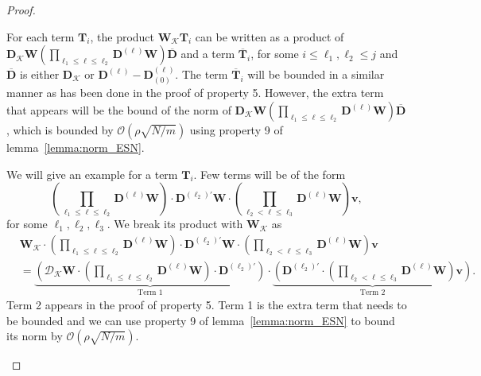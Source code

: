 \begin{proof}
\begin{enumerate}
		For each term $\mathbf{T}_i$, the product $\mathbf{W}_{\mathcal{K}} \mathbf{T}_i$ can be written as a product of $\mathbf{D}_{\mathcal{K}} \mathbf{W} (\prod_{\ell_1 \le \ell \le \ell_2 } \mathbf{D}^{(\ell)} \mathbf{W}) \overline{\mathbf{D}}$ and a term $\overline{\mathbf{T}}_i$, for some $i \le \ell_1, \ell_2 \le j$ and $\overline{\mathbf{D}}$ is either $\mathbf{D}_{\mathcal{K}}$ or $\mathbf{D}^{(\ell)} - \mathbf{D}^{(\ell)}_{(0)}$. The term $\overline{\mathbf{T}}_i$ will be bounded in a similar manner as has been done in the proof of property 5. However, the extra term that appears will be the bound of the norm of $\mathbf{D}_{\mathcal{K}} \mathbf{W} (\prod_{\ell_1 \le \ell \le \ell_2 } \mathbf{D}^{(\ell)} \mathbf{W}) \overline{\mathbf{D}}$, which is bounded by $\mathcal{O}(\rho \sqrt{N/m})$ using property 9 of lemma~\ref{lemma:norm_ESN}. 
		
		We will give an example for a term $\mathbf{T}_i$. Few terms will be of the form \begin{equation*}
			(\prod_{\ell_1 \le \ell \le \ell_2 } \mathbf{D}^{(\ell)} \mathbf{W}) \cdot \mathbf{D}^{(\ell_2)\prime} \mathbf{W}  \cdot (\prod_{\ell_2 < \ell \le \ell_3 } \mathbf{D}^{(\ell)} \mathbf{W}) \mathbf{v}, 
		\end{equation*}
		for some $\ell_1, \ell_2, \ell_3$. We break its product with $\mathbf{W}_{\mathcal{K}}$ as
		\begin{align*}
			&\mathbf{W}_{\mathcal{K}} \cdot (\prod_{\ell_1 \le \ell \le \ell_2 } \mathbf{D}^{(\ell)} \mathbf{W}) \cdot \mathbf{D}^{(\ell_2)\prime} \mathbf{W}  \cdot (\prod_{\ell_2 < \ell \le \ell_3 } \mathbf{D}^{(\ell)} \mathbf{W}) \mathbf{v} \\&=
			\underbrace{\left(\mathcal{D}_{\mathcal{K}} \mathbf{W} \cdot (\prod_{\ell_1 \le \ell \le \ell_2 } \mathbf{D}^{(\ell)} \mathbf{W}) \cdot \mathbf{D}^{(\ell_2)\prime} \right)}_{\text{Term 1}} \cdot \underbrace{\left(\mathbf{D}^{(\ell_2)\prime} \cdot (\prod_{\ell_2 < \ell \le \ell_3 } \mathbf{D}^{(\ell)} \mathbf{W}) \mathbf{v}\right)}_{\text{Term 2}}. 
		\end{align*}
		Term 2 appears in the proof of property 5. Term 1 is the extra term that needs to be bounded and we can use property 9 of lemma~\ref{lemma:norm_ESN} to bound its norm by $\mathcal{O}(\rho \sqrt{N/m})$. 
	\end{enumerate}
\end{proof}

